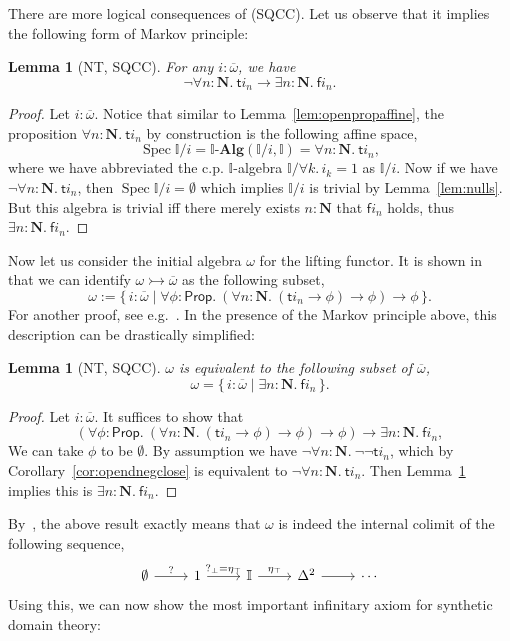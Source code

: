 \documentclass[12pt]{amsart}
\newtheorem{lemma}[theorem]{Lemma}
\theoremstyle{definition}
\newcommand{\mb}[1]{\mathbf{#1}}
\newcommand{\mbb}[1]{\mathbb{#1}}
\newcommand{\I}{\mbb I}
\newcommand{\ms}[1]{\mathsf{#1}}
\newcommand{\alg}{\text{-}\mb{Alg}}
\newcommand{\ov}[1]{\overline{#1}}
\newcommand{\scomp}[2]{\{\,#1\mid#2\,\}}
\newcommand{\inj}{\rightarrowtail}
\newcommand{\prth}[1]{\left(#1\right)}
\newcommand{\N}{\mb N}
\newcommand{\prt}{_{\bot}}
\newcommand{\cprt}{_{\top}}
\newcommand{\fa}[2]{\forall #1\!\colon\!\!#2.\ }
\newcommand{\ex}[2]{\exists #1\!\colon\!\!#2.\ }
\newcommand{\emp}{\emptyset}
\newcommand{\pp}{\ms{Prop}}
\newcommand{\spec}{\operatorname{Spec}}
\begin{document}
There are more logical consequences of (SQCC). Let us observe that it implies the following form of Markov principle:

\begin{lemma}[NT, SQCC]\label{lem:markov}
  For any $i : \ov\omega$, we have
  \[ \neg\fa{n}{\N}\ms ti_n \to \ex n\N\ms fi_n. \]
\end{lemma}
\begin{proof}
  Let $i : \ov\omega$. Notice that similar to Lemma~\ref{lem:openpropaffine}, the proposition $\fa n\N \ms ti_n$ by construction is the following affine space, 
  \[ \spec\I/i = \I\alg(\I/i,\I) = \fa n\N \ms ti_n, \]
  where we have abbreviated the c.p. $\I$-algebra $\I/\forall k.\, i_k = 1$ as $\I/i$. Now if we have $\neg\fa n\N \ms ti_n$, then $\spec\I/i = \emp$ which implies $\I/i$ is trivial by Lemma~\ref{lem:nulls}. But this algebra is trivial iff there merely exists $n : \N$ that $\ms fi_n$ holds, thus $\ex n\N \ms fi_n$.
\end{proof}

Now let us consider the initial algebra $\omega$ for the lifting functor. It is shown in~\cite{JIBLADZE1997185} that we can identify $\omega \inj \ov\omega$ as the following subset,
\[ \omega := \scomp{i : \ov\omega}{\fa\phi{\pp} (\fa n{\N} (\ms ti_n \to \phi) \to \phi) \to \phi}. \]
For another proof, see e.g.~\cite{VANOOSTEN2000233}. In the presence of the Markov principle above, this description can be drastically simplified:

\begin{lemma}[NT, SQCC]\label{lem:omegacolimit}
  $\omega$ is equivalent to the following subset of $\ov\omega$,
  \[ \omega = \scomp{i : \ov\omega}{\ex n{\N} \ms fi_n}. \]
\end{lemma}
\begin{proof}
  Let $i : \ov\omega$. It suffices to show that
  \[ \prth{\fa\phi{\pp} (\fa n{\N} (\ms ti_n \to \phi) \to \phi) \to \phi} \to \ex{n}\N \ms fi_n, \]
  We can take $\phi$ to be $\emp$. By assumption we have $\neg\fa n\N \neg\neg\ms ti_n$, which by Corollary~\ref{cor:opendnegclose} is equivalent to $\neg\fa n\N \ms ti_n$. Then Lemma~\ref{lem:markov} implies this is $\ex n\N \ms fi_n$.
\end{proof}

By~\cite[Cor. 1.10]{VANOOSTEN2000233}, the above result exactly means that $\omega$ is indeed the internal colimit of the following sequence,
\[ 
\begin{tikzcd}
  \emp \ar[r, "?"] & 1 \ar[r, "?\prt = \eta\cprt"] & \I \ar[r, "\eta\cprt"] & \Delta^2 \ar[r] & \cdots
\end{tikzcd}
\]
Using this, we can now show the most important infinitary axiom for synthetic domain theory:
\end{document}
